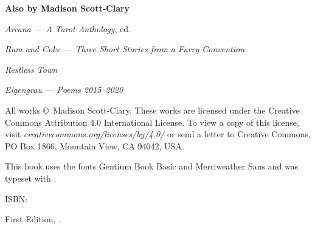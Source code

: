 
\thispagestyle{empty}
\null
\vfill
\begin{center}
    \noindent\textbf{Also by Madison Scott-Clary}

    \emph{Arcana --- A Tarot Anthology}, ed.

    \emph{Rum and Coke --- Three Short Stories from a Furry Convention}

    \emph{Restless Town}

    \emph{Eigengrau --- Poems 2015--2020}
\end{center}
\vfill
\singlespacing
{\small\parindent0pt\parskip5pt
\noindent All works \copyright\ Madison Scott-Clary. These works are licensed under the Creative Commons Attribution 4.0 International License. To view a copy of this license, visit \mbox{\emph{creativecommons.org/licenses/by/4.0/}} or send a letter to Creative Commons, PO Box 1866, Mountain View, CA 94042, USA.

This book uses the fonts Gentium Book Basic and  {\allyFont Merriweather Sans} and was typeset with {\XeLaTeX}.

\vspace{1ex}

ISBN: \ISBN

\vspace{1ex}

\emph{\Title}

\vspace{1ex}

First Edition, \Year.

\EditionsList
}

\cleardoublepage
